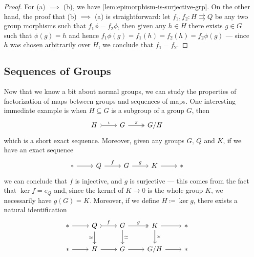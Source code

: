 \begin{proof}
For (a) \(\implies\) (b), we have \cref{lem:epimorphism-is-surjective-grp}. On
the other hand, the proof that (b) \(\implies\) (a) is straightforward: let
\(f_1, f_2: H \rightrightarrows Q\) be any two group morphisms such that
\(f_1 \phi = f_2 \phi\), then given any \(h \in H\) there exists \(g \in G\)
such that \(\phi(g) = h\) and hence \(f_1\phi(g) = f_1(h) = f_2(h) = f_2
\phi(g)\) --- since \(h\) was chosen arbitrarily over \(H\), we conclude that
\(f_1 = f_2\).
\end{proof}

\subsection{Sequences of Groups}


Now that we know a bit about normal groups, we can study the properties of
factorization of maps between groups and sequences of maps. One interesting
immediate example is when \(H \subseteq G\) is a subgroup of a group \(G\), then
\[
  \begin{tikzcd}
    H \ar[r, tail, "\iota"] &G \ar[r, two heads, "\pi"] &G/H
  \end{tikzcd}
\]
which is a short exact sequence. Moreover, given any groups \(G\), \(Q\) and
\(K\), if we have an exact sequence
\[
  \begin{tikzcd}
    * \ar[r] &Q \ar[r, "f"] &G \ar[r, "g"] &K \ar[r] &*
  \end{tikzcd}
\]
we can conclude that \(f\) is injective, and \(g\) is surjective --- this comes
from the fact that \(\ker f = e_Q\) and, since the kernel of \(K \to 0\) is the
whole group \(K\), we necessarily have \(g(G) = K\). Moreover, if we define \(H
\coloneq \ker g\), there exists a natural identification
\[
  \begin{tikzcd}
    * \ar[r]
    &Q \ar[d, swap, "\iso"] \ar[r, tail, "f"]
    &G \ar[r, two heads, "g"] \ar[d, "\iso"]
    &K \ar[r] \ar[d, "\iso"]
    &* \\
    * \ar[r] &H \ar[r] &G \ar[r] &G/H \ar[r] &* \\
  \end{tikzcd}
\]

